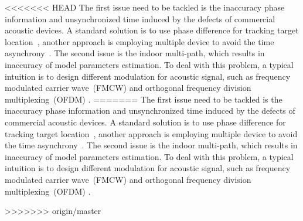 <<<<<<< HEAD
The first issue need to be tackled is the inaccuracy phase information and unsynchronized time induced by the defects of commercial
acoustic devices. A standard solution is to use phase difference for tracking target location~\cite{LLAP}, another approach is employing
multiple device to avoid the time asynchrony~\cite{BeepBeep}.  The second issue is the indoor multi-path, which results in inaccuracy of
model parameters estimation. To deal with this problem, a typical intuition is to design different modulation for acoustic signal, such as
frequency modulated carrier wave~(FMCW) and orthogonal frequency division multiplexing~(OFDM) \cite{CAT,STRATA}.
=======
The first issue need to be tackled is the inaccuracy phase information and unsynchronized time induced by the defects of commercial acoustic devices. A standard solution is to use phase difference for tracking target location~\cite{LLAP}, another approach is employing multiple device to avoid the time asynchrony~\cite{BeepBeep}.  The second issue is the indoor multi-path, which results in inaccuracy of model parameters estimation. To deal with this problem, a typical intuition is to design different modulation for acoustic signal, such as frequency modulated carrier wave~(FMCW) and orthogonal frequency division multiplexing~(OFDM) \cite{CAT,STRATA}.





>>>>>>> origin/master
